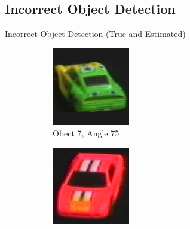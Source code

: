 \documentclass[aspectratio=169, handout, 10pt, hyperref=colorlinks]{beamer}
\begin{document}
\subsection{Incorrect Object Detection}
\begin{frame}{Incorrect Object Detection (True and Estimated)}
    \begin{figure}
        \centering
        \begin{subfigure}{0.32\linewidth}
            \centering
            \includegraphics[width = 0.6\linewidth]{incorrect/obj8__75.png}
            \vspace{1em}
            \caption{Obect 7, Angle 75}
        \end{subfigure}
        \begin{subfigure}{0.32\linewidth}
            \centering
            \includegraphics[width = 0.6\linewidth]{incorrect/obj23__280.png}

\end{subfigure}
\end{figure}
\end{frame}
\end{document}
